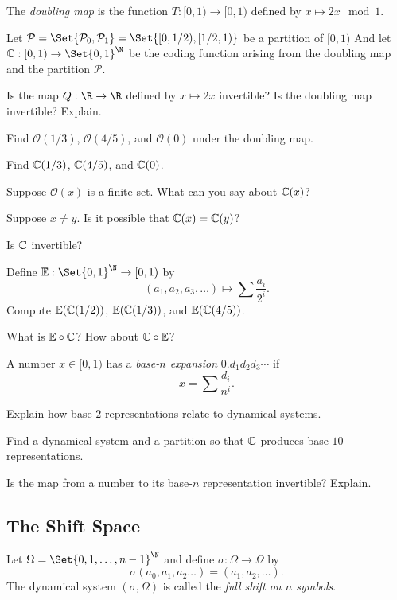 	The \emph{doubling map} is the function $T:[0,1)\to[0,1)$ defined by $x\mapsto 2x\mod 1$.

	\question
	Let $\mathcal P=\Set{\mathcal P_0,\mathcal P_1} = \Set{[0,1/2),[1/2,1)}$ be a partition of $[0,1)$
	And let $\C:[0,1)\to\Set{0,1}^\N$ be the coding function arising from the doubling map and the partition $\mathcal P$.
	\begin{parts}
		\item Is the map $Q:\R\to\R$ defined by $x\mapsto 2x$ invertible? Is the doubling map invertible? Explain.
		\item Find $\mathcal O(1/3)$, $\mathcal O(4/5)$, and $\mathcal O(0)$ under the doubling map.
		\item Find $\mathbb{C}(1/3)$, $\mathbb{C}(4/5)$, and $\mathbb{C}(0)$.
		\item Suppose $\mathcal O(x)$ is a finite set. What can you say about $\mathbb{C}(x)$?
		\item Suppose $x\neq y$. Is it possible that $\mathbb{C}(x)=\mathbb{C}(y)$?
		\item Is $\mathbb{C}$ invertible?
		\item Define $\E:\Set{0,1}^\N\to[0,1)$ by \[
				(a_1,a_2,a_3,\ldots)\mapsto \sum \frac{a_i}{2^i}.
				\]
		Compute $\mathbb{E}(\mathbb{C}(1/2))$,  $\mathbb{E}(\mathbb{C}(1/3))$, and $\mathbb{E}(\mathbb{C}(4/5))$.
		\item What is $\mathbb{E}\circ \mathbb{C}$? How about $\mathbb{C}\circ \mathbb{E}$?
	\end{parts}

	\begin{definition}
		A number $x\in [0,1)$ has a \emph{base-$n$ expansion} $0.d_1d_2d_3\cdots$ if
		\[
			x=\sum \frac{d_i}{n^i}.
		\]
	\end{definition}

	\question
	\begin{parts}
		\item Explain how base-$2$ representations relate to dynamical systems.
		\item Find a dynamical system and a partition so that $\mathbb{C}$ produces base-$10$ representations.
		\item Is the map from a number to its base-$n$ representation invertible? Explain.
	\end{parts}


	\newpage
	\subsection*{The Shift Space}

	\begin{definition}
		Let $\Omega=\Set{0,1,\ldots,n-1}^\N$ and define $\sigma:\Omega\to\Omega$ by
		\[
			\sigma(a_0,a_1,a_2\ldots) = (a_1,a_2,\ldots).
		\]
		The dynamical system $(\sigma, \Omega)$ is called
		the \emph{full shift on $n$ symbols}. 
	\end{definition}

